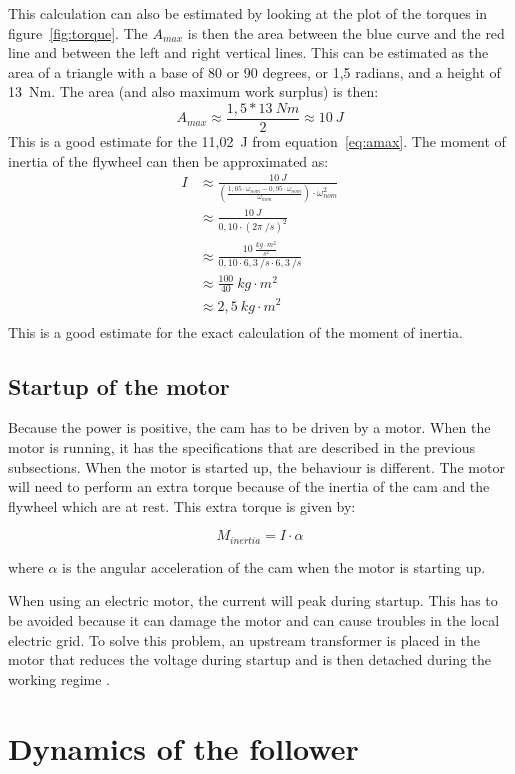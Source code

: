 \documentclass[a4paper]{article}
\begin{document}
This calculation can also be estimated by looking at the plot of the torques in figure~\ref{fig:torque}. The \(A_{max}\) is then the area between the blue curve and the red line and between the left and right vertical lines. This can be estimated as the area of a triangle with a base of 80 or 90 degrees, or 1,5 radians, and a height of 13~Nm. The area (and also maximum work surplus) is then:
\begin{equation}
	A_{max}\approx\frac{1,5*13~Nm}{2}\approx 10~J
\end{equation} 
This is a good estimate for the 11,02~J from equation~\ref{eq:amax}. The moment of inertia of the flywheel can then be approximated as:
\begin{equation}
	\begin{split}
	I &\approx\frac{10~J}{(\frac{1,05\cdot \omega_{nom}-0,95\cdot\omega_{nom}}{\omega_{nom}})\cdot\omega_{nom}^2}\\
	 &\approx \frac{10~J}{0,10\cdot(2\pi~/s)^2}\\
	 &\approx \frac{10~\frac{kg\cdot m^2}{s^2}}{0,10\cdot 6,3~/s \cdot 6,3~/s}\\
	 &\approx \frac{100}{40}~kg\cdot m^2\\
	 &\approx 2,5~kg\cdot m^2\\
	\end{split}
\end{equation}
This is a good estimate for the exact calculation of the moment of inertia.

\subsection{Startup of the motor}

Because the power is positive, the cam has to be driven by a motor. When the motor is running, it has the specifications that are described in the previous subsections. When the motor is started up, the behaviour is different. The motor will need to perform an extra torque because of the inertia of the cam and the flywheel which are at rest. This extra torque is given by:

\begin{equation}
	M_{inertia} = I \cdot \alpha
\end{equation}

where \(\alpha\) is the angular acceleration of the cam when the motor is starting up. 

When using an electric motor, the current will peak during startup. This has to be avoided because it can damage the motor and can cause troubles in the local electric grid. To solve this problem, an upstream transformer is placed in the motor that reduces the voltage during startup and is then detached during the working regime \cite{eea}.

\section{Dynamics of the follower}



\end{document}
